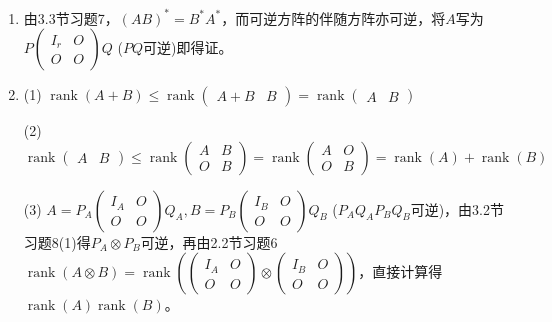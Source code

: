 \documentclass[a4paper,UTF8,fontset=windows]{ctexart}
\DeclareMathOperator{\rank}{rank}
\begin{document}
\begin{enumerate}
(4) 由(3)取转置即可证明。

(5) 未必。反例$A=\begin{pmatrix}1&0\\0&0\end{pmatrix},B=\begin{pmatrix}1&0\\0&0\end{pmatrix},C=\begin{pmatrix}1&0\\0&0\end{pmatrix},D=\begin{pmatrix}0&0\\0&1\end{pmatrix}$。

\item
由3.3节习题7，$(AB)^\ast=B^\ast A^\ast$，而可逆方阵的伴随方阵亦可逆，将$A$写为$P\begin{pmatrix}I_r&O\\O&O\end{pmatrix}Q$ ($PQ$可逆)即得证。

\item
(1) $\rank(A+B)\le\rank\begin{pmatrix}A+B&B\end{pmatrix}=\rank\begin{pmatrix}A&B\end{pmatrix}$

(2)$\rank\begin{pmatrix}A&B\end{pmatrix}\le\rank\begin{pmatrix}A&B\\O&B\end{pmatrix}=\rank\begin{pmatrix}A&O\\O&B\end{pmatrix}=\rank(A)+\rank(B)$

(3) $A=P_A\begin{pmatrix}I_A&O\\O&O\end{pmatrix}Q_A,B=P_B\begin{pmatrix}I_B&O\\O&O\end{pmatrix}Q_B$ ($P_AQ_AP_BQ_B$可逆)，由3.2节习题8(1)得$P_A\otimes P_B$可逆，再由2.2节习题6$\rank(A\otimes B)=\rank\left(\begin{pmatrix}I_A&O\\O&O\end{pmatrix}\otimes\begin{pmatrix}I_B&O\\O&O\end{pmatrix}\right)$，直接计算得$\rank(A)\rank(B)$。


\end{enumerate}
\end{document}
